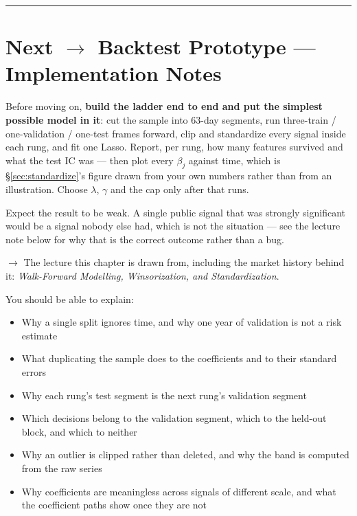 \documentclass[11pt]{article}
\theoremstyle{runin}
\newcommand{\tickbox}{\framebox[0.8em]{\rule{0pt}{0.62em}}}
\begin{document}
\bigskip
\hrule
\bigskip

\section*{Next $\rightarrow$ Backtest Prototype --- Implementation Notes}

Before moving on, \textbf{build the ladder end to end and put the simplest possible model in it}:
cut the sample into 63-day segments, run three-train / one-validation / one-test frames forward,
clip and standardize every signal inside each rung, and fit one Lasso. Report, per rung, how many
features survived and what the test IC was --- then plot every $\beta_j$ against time, which is
\S\ref{sec:standardize}'s figure drawn from your own numbers rather than from an illustration.
Choose $\lambda$, $\gamma$ and the cap only after that runs.

Expect the result to be weak. A single public signal that was strongly significant would be a
signal nobody else had, which is not the situation --- see the lecture note below for why that is
the correct outcome rather than a bug.

$\rightarrow$ The lecture this chapter is drawn from, including the market history behind it:
\textit{Walk-Forward Modelling, Winsorization, and Standardization}.

You should be able to explain:

\begin{itemize}[label=\tickbox]
  \item Why a single split ignores time, and why one year of validation is not a risk estimate
  \item What duplicating the sample does to the coefficients and to their standard errors
  \item Why each rung's test segment is the next rung's validation segment
  \item Which decisions belong to the validation segment, which to the held-out block, and which
    to neither
  \item Why an outlier is clipped rather than deleted, and why the band is computed from the raw
    series
  \item Why coefficients are meaningless across signals of different scale, and what the
    coefficient paths show once they are not
\end{itemize}
\end{document}
